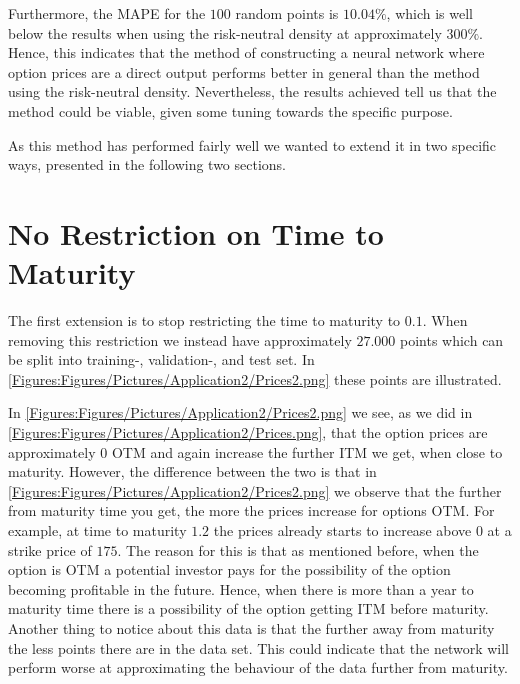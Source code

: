 
Furthermore, the MAPE for the $100$ random points is $10.04\%$, which is well below the results when using the risk-neutral density at approximately $300\%$. Hence, this indicates that the method of constructing a neural network where option prices are a direct output performs better in general than the method using the risk-neutral density. Nevertheless, the results achieved tell us that the method could be viable, given some tuning towards the specific purpose.

As this method has performed fairly well we wanted to extend it in two specific ways, presented in the following two sections.  


\section{No Restriction on Time to Maturity} \label{sec:no_restric}
The first extension is to stop restricting the time to maturity to $0.1$. When removing this restriction we instead have approximately $27.000$ points which can be split into training-, validation-, and test set. In \autoref{Figures:Figures/Pictures/Application2/Prices2.png} these points are illustrated. 


In \autoref{Figures:Figures/Pictures/Application2/Prices2.png} we see, as we did in \autoref{Figures:Figures/Pictures/Application2/Prices.png}, that the option prices are approximately $0$ OTM and again increase the further ITM we get, when close to maturity. However, the difference between the two is that in \autoref{Figures:Figures/Pictures/Application2/Prices2.png} we observe that the further from maturity time you get, the more the prices increase for options OTM. For example, at time to maturity $1.2$ the prices already starts to increase above $0$ at a strike price of $175$. The reason for this is that as mentioned before, when the option is OTM a potential investor pays for the possibility of the option becoming profitable in the future. Hence, when there is more than a year to maturity time there is a possibility of the option getting ITM before maturity. Another thing to notice about this data is that the further away from maturity the less points there are in the data set. This could indicate that the network will perform worse at approximating the behaviour of the data further from maturity. 

